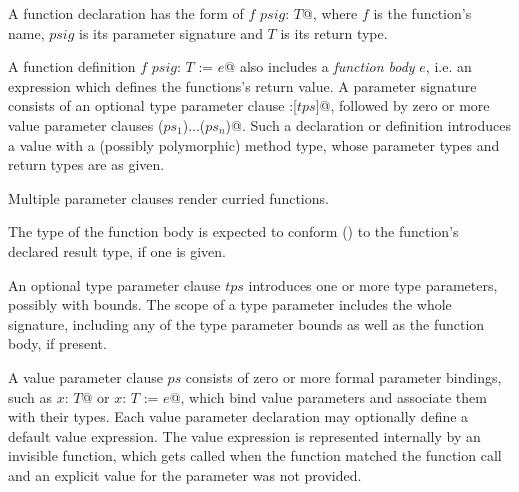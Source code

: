 
A function declaration has the form of \lstinline@def $f$ $psig$: $T$@, where $f$ is the function's name, $psig$ is its parameter signature and $T$ is its return type. 

A function definition \lstinline@def $f$ $psig$: $T$ := $e$@ also includes a {\em function body} $e$, i.e. an expression which defines the functions's return value. A parameter signature consists of an optional type parameter clause \lstinline@:[$tps$]@, followed by zero or more value parameter clauses \lstinline@($ps_1$)$\ldots$($ps_n$)@. Such a declaration or definition introduces a value with a (possibly polymorphic) method type, whose parameter types and return types are as given. 

Multiple parameter clauses render curried functions. 

The type of the function body is expected to conform () to the function's declared result type, if one is given. 

An optional type parameter clause $tps$ introduces one or more type parameters, possibly with bounds. The scope of a type parameter includes the whole signature, including any of the type parameter bounds as well as the function body, if present. 

A value parameter clause $ps$ consists of zero or more formal parameter bindings, such as \lstinline@$x$: $T$@ or \lstinline@$x$: $T$ := $e$@, which bind value parameters and associate them with their types. Each value parameter declaration may optionally define a default value expression. The value expression is represented internally by an invisible function, which gets called when the function matched the function call and an explicit value for the parameter was not provided.

